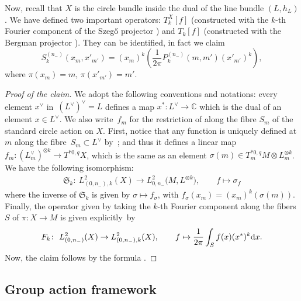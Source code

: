 \documentclass[10pt,a4paper]{amsart}
\numberwithin{equation}{section}
\begin{document}
	Now, recall that $X$ is the circle bundle inside the dual of the line bundle $(L, h_L)$. We have defined two important operators: $T_{k}^X[f]$ \big(constructed with the $k$-th Fourier component of the Szeg\H{o} projector \big) and $T_{k}[f]$ \big(constructed with the Bergman projector \big). They can be identified, in fact we claim
	\[S_{k}^{(n_-)}(x_m,x'_{m'})=(x_m)^k \left(\frac{1}{2\pi}P_{k}^{(n_-)}(m,m')(x'_{m'})^k \right) , \]
	where $\pi(x_m)=m$, $\pi(x'_{m'})=m'$.
	
	\begin{proof}[Proof of the claim]
		We adopt the following conventions and notations: every element $x^{\vee}$ in~$ {(L^{\vee})^{\vee}=L}$ defines a map $x^* \colon L^{\vee}\rightarrow \mathbb{C}$ which is the dual of an element $x\in L^{\vee}$. We also write~$f_m$ for the restriction of  along the fibre $S_m$ of the standard circle action on $X$. First, notice that any function  is uniquely defined at $m$ along the fibre~${S_m\subset L^{\vee}}$ by~;
		and thus it defines a linear map ${f_m \colon (L^{\vee}_m)^{\otimes k}\rightarrow T^{*0,q}X}$, which is the same as an element $\sigma(m) \in T^{*0,q}_mM\otimes L^{\otimes k}_m$.
		We have the following isomorphism:
		\begin{align*}\mathfrak{S}_k \colon\ L^2_{(0,n_-),k}(X) \rightarrow L^2_{0,n_-}\bigl(M,L^{\otimes k}\bigr) ,\qquad
			f\mapsto \sigma_f\end{align*}	
		where the inverse of $\mathfrak{S}_k$ is given by $\sigma \mapsto f_{\sigma}$, with $f_{\sigma}(x_m)=(x_m)^k(\sigma(m))$. Finally, the operator given by taking the $k$-th Fourier component along the fibers $S$ of $\pi \colon X\rightarrow M$ is given explicitly~by
		\begin{align*}F_k \colon\ L^2_{(0,n_-)}(X) \rightarrow L^2_{(0,n_-),k}(X),\qquad
			f\mapsto \frac{1}{2\pi}\int_S f(x) (x^*)^k {\rm d}x .\end{align*}
		Now, the claim follows by the formula
		.	
	\end{proof}

\subsection{Group action framework}
\end{document}

